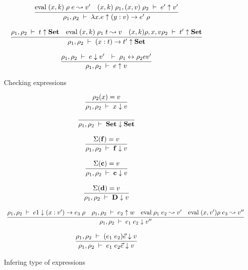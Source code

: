 \begin{figure}[p]
\[\begin{array}{c}
	  \infer{\Check{\rho_1}{\rho_2}{\lam x . e}{\VPi{y}{v}{e'}{\rho}}}
          { \Eval{(x,k)\;\rho}{e}{v'} & \Check{(x,k)\;\rho_1}{(x,v)\;\rho_2}{e'}{v'}} 
\end{array}
\]

\[\begin{array}{c}
	  \infer{\Check{\rho_1}{\rho_2}{\EPi{x}{t}{t'}}{\Set}}
          {\IsType{\rho_1}{\rho_2}{t}  
	    & \Eval{(x,k)\;\rho_1}{t}{v}
	    & \IsType{(x,k)\rho}{{x,v}\rho_2}{t'}}
\end{array}
\]

\[\begin{array}{c}
	  \infer{\Check{\rho_1}{\rho_2}{e}{v}} 
          { \Infer{\rho_1}{\rho_2}{e}{v'} & \EqVal{\rho_1}{\rho_2}{e}{v'}} 
\end{array}
\]
\caption{Checking expressions}
\end{figure}

\begin{figure}[p]
\[\begin{array}{c}
	  \infer{\Infer{\rho_1}{\rho_2}{x}{v}} 
          {\Lookup{\rho_2}{x}{v}}
\end{array}
\]

\[\begin{array}{c}
	  \infer{\Infer{\rho_1}{\rho_2}{\Set}{\Set}} 
          {}
\end{array}
\]

\[\begin{array}{c}
	  \infer{\Infer{\rho_1}{\rho_2}{\ff}{v}} 
          {\Lookup{\Sigma}{\ff}{v}}
\end{array}
\]

\[\begin{array}{c}
	  \infer{\Infer{\rho_1}{\rho_2}{\cc}{v}} 
          {\Lookup{\Sigma}{\cc}{v}}
\end{array}
\]

\[\begin{array}{c}
	  \infer{\Infer{\rho_1}{\rho_2}{\DD}{v}} 
          {\Lookup{\Sigma}{\dd}{v}}
\end{array}
\]

\[\begin{array}{c}
	  \infer{\Infer{\rho_1}{\rho_2}{e_1 \; e_2}{v''}}
{\Infer{\rho_1}{\rho_2}{e1}{\VPi{x}{v'}{e_3}{\rho}}
& \Check{\rho_1}{\rho_2}{e_2}{w}
& \Eval{\rho_1}{e_2}{v'}
& \Eval{(x,v')\rho}{e_3}{v''}}

\end{array}
\]

\[\begin{array}{c}
	  \infer{\Infer{\rho_1}{\rho_2}{e_1 \; e_2 \vec{e}}{v}
	  } 
          {\Infer{\rho_1}{\rho_2}{(e_1 \; e_2) \vec{e}}{v}}
\end{array}
\]



\caption{Infering type of expressions}
\end{figure}


